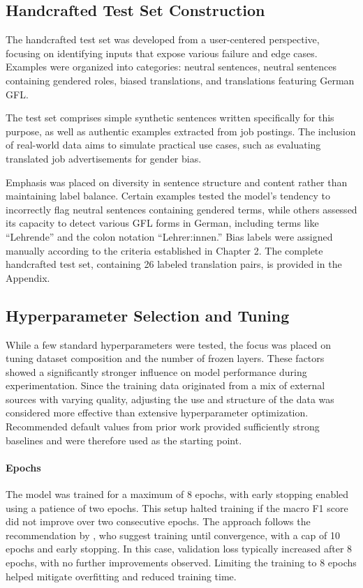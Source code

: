\subsection{Handcrafted Test Set Construction} \label{subsection:eval_dataset}
    The handcrafted test set was developed from a user-centered perspective, focusing on identifying inputs that expose various failure and edge cases. Examples were organized into categories: neutral sentences, neutral sentences containing gendered roles, biased translations, and translations featuring German GFL. 

    The test set comprises simple synthetic sentences written specifically for this purpose, as well as authentic examples extracted from job postings. The inclusion of real-world data aims to simulate practical use cases, such as evaluating translated job advertisements for gender bias.

    Emphasis was placed on diversity in sentence structure and content rather than maintaining label balance. Certain examples tested the model’s tendency to incorrectly flag neutral sentences containing gendered terms, while others assessed its capacity to detect various GFL forms in German, including terms like “Lehrende” and the colon notation “Lehrer:innen.” Bias labels were assigned manually according to the criteria established in Chapter 2. The complete handcrafted test set, containing 26 labeled translation pairs, is provided in the Appendix.

\subsection{Hyperparameter Selection and Tuning} \label{subsection:hyperparameter_tuning_methodology}
     While a few standard hyperparameters were tested, the focus was placed on tuning dataset composition and the number of frozen layers. These factors showed a significantly stronger influence on model performance during experimentation. Since the training data originated from a mix of external sources with varying quality, adjusting the use and structure of the data was considered more effective than extensive hyperparameter optimization. Recommended default values from prior work provided sufficiently strong baselines and were therefore used as the starting point.

    \paragraph{Epochs} The model was trained for a maximum of 8 epochs, with early stopping enabled using a patience of two epochs. This setup halted training if the macro F1 score did not improve over two consecutive epochs. The approach follows the recommendation by \textcite{pecherComparingSpecialisedSmall2024}, who suggest training until convergence, with a cap of 10 epochs and early stopping. In this case, validation loss typically increased after 8 epochs, with no further improvements observed. Limiting the training to 8 epochs helped mitigate overfitting and reduced training time.

